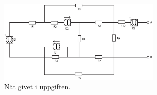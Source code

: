 \documentclass[a4paper,12pt]{article}
\begin{document}
\maketitle
\thispagestyle{empty}
\newpage

	
\begin{figure}[h]
\centering
\includegraphics[width=0.7\textwidth]{bilder/originalnat.eps}
\caption{Nät givet i uppgiften.}
\label{fig:original}
\end{figure}
\end{document}
